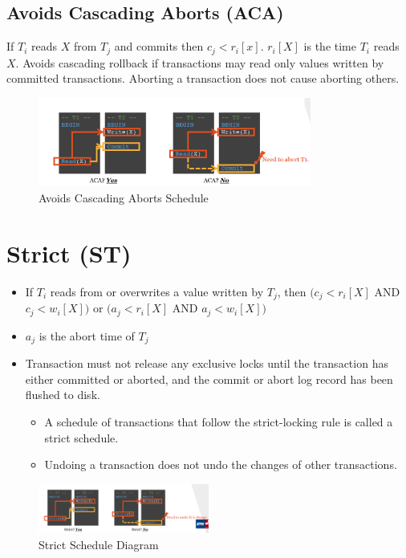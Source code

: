 \documentclass{article}
\begin{document}
\subsection{Avoids Cascading Aborts (ACA)}

If \(T_i\) reads \(X\) from \(T_j\) and commits then \(c_j < r_i[x]\).
\(r_i[X]\) is the time \(T_i\) reads \(X\). Avoids cascading rollback if
transactions may read only values written by committed transactions. Aborting a
transaction does not cause aborting others.

\begin{figure}[h]
    \centering
    \includegraphics[width=0.8\textwidth]{assets/aca.png}
    \caption{Avoids Cascading Aborts Schedule \cite{database-lecture}}
\end{figure}

\section*{Strict (ST)}
\begin{itemize}
    \item If $T_i$ reads from or overwrites a value written by $T_j$, then $(c_j <
              r_i[X]$ AND $c_j < w_i[X])$ or $(a_j < r_i[X]$ AND $a_j < w_i[X])$
    \item $a_j$ is the abort time of $T_j$
    \item Transaction must not release any exclusive locks until the transaction has
          either committed or aborted, and the commit or abort log record has been
          flushed to disk.
          \begin{itemize}
              \item A schedule of transactions that follow the strict-locking rule is called a
                    strict schedule.
              \item Undoing a transaction does not undo the changes of other transactions.
          \end{itemize}
\end{itemize}

\begin{figure}[h]
    \centering
    \includegraphics[width=0.5\textwidth]{assets/strict.png}
    \caption{Strict Schedule Diagram}
\end{figure}
\end{document}
